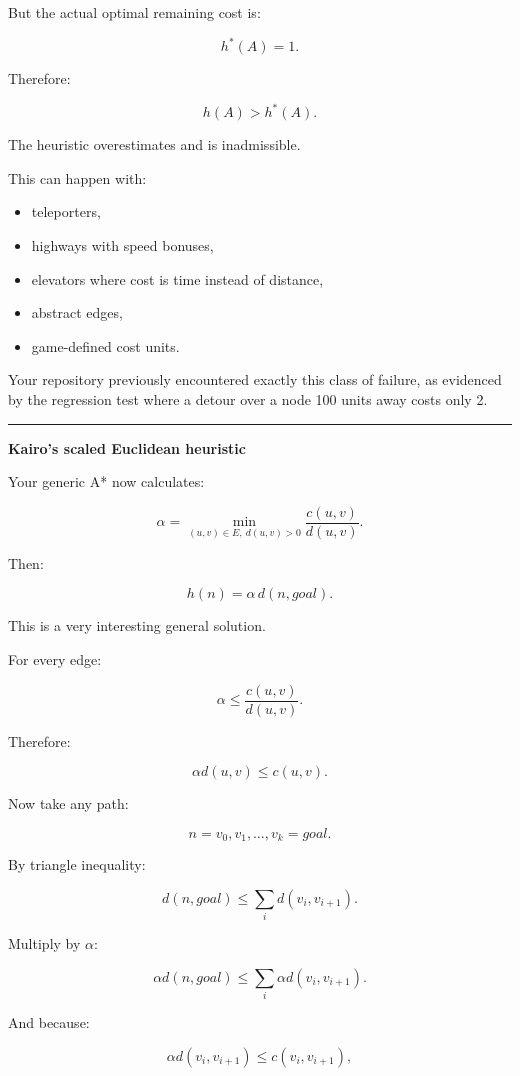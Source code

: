 But the actual optimal remaining cost is:

\[
h^*(A)=1.
\]

Therefore:

\[
h(A)>h^*(A).
\]

The heuristic overestimates and is inadmissible.

This can happen with:

\begin{itemize}
\tightlist
\item
  teleporters,
\item
  highways with speed bonuses,
\item
  elevators where cost is time instead of distance,
\item
  abstract edges,
\item
  game-defined cost units.
\end{itemize}

Your repository previously encountered exactly this class of failure, as evidenced by the regression test where a detour over a node 100 units away costs only 2.

\begin{center}\rule{0.5\linewidth}{0.5pt}\end{center}

\textbf{Kairo's scaled Euclidean heuristic}

Your generic A* now calculates:

\[
\alpha=
\min_{(u,v)\in E,\ d(u,v)>0}
\frac{c(u,v)}{d(u,v)}.
\]

Then:

\[
\boxed{
h(n)=
\alpha\,d(n,goal).
}
\]

This is a very interesting general solution.

For every edge:

\[
\alpha
\le
\frac{c(u,v)}{d(u,v)}.
\]

Therefore:

\[
\alpha d(u,v)
\le
c(u,v).
\]

Now take any path:

\[
n=v_0,v_1,\dots,v_k=goal.
\]

By triangle inequality:

\[
d(n,goal)
\le
\sum_i d(v_i,v_{i+1}).
\]

Multiply by \(\alpha\):

\[
\alpha d(n,goal)
\le
\sum_i
\alpha d(v_i,v_{i+1}).
\]

And because:

\[
\alpha d(v_i,v_{i+1})
\le
c(v_i,v_{i+1}),
\]


